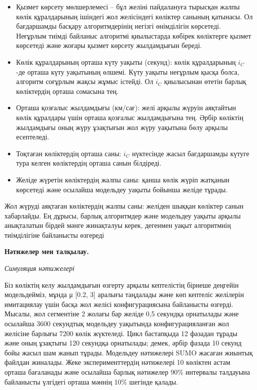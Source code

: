 \begin{itemize}
\item
  Қызмет көрсету мөлшерлемесі -- бұл желіні пайдалануға тырысқан жалпы
  көлік құралдарының ішіндегі жол желісіндегі көліктер санының қатынасы.
  Ол бағдаршамды басқару алгоритмдерінің негізгі өнімділігін көрсетеді.
  Неғұрлым тиімді байланыс алгоритмі қиылыстарда көбірек көліктерге
  қызмет көрсетеді және жоғары қызмет көрсету жылдамдығын береді.
\item
  Көлік құралдарының орташа күту уақыты (секунд): көлік құралдарының
  \(i_{C}\) -де орташа күту уақытының өлшемі. Күту уақыты неғұрлым қысқа
  болса, алгоритм соғұрлым жақсы жұмыс істейді. Ол \(i_{C}\) қиылысынан
  өтетін барлық көліктердің орташа сомасына тең.
\item
  Орташа қозғалыс жылдамдығы (км/сағ): желі арқылы жүруін аяқтайтын
  көлік құралдары үшін орташа қозғалыс жылдамдығына тең. Әрбір көліктің
  жылдамдығы оның жүру ұзақтығын жол жүру уақытына бөлу арқылы
  есептеледі.
\item
  Тоқтаған көліктердің орташа саны: \(i_{C}\) нүктесінде жасыл
  бағдаршамды күтуге тура келген көліктердің орташа санын білдіреді.
\item
  Желіде жүретін көліктердің жалпы саны: қанша көлік жүріп жатқанын
  көрсетеді және осылайша модельдеу уақыты бойынша желіде тұрады.
\end{itemize}

Жол жүруді аяқтаған көліктердің жалпы саны: желіден шыққан көліктер
санын хабарлайды. Ең дұрысы, барлық алгоритмдер және модельдеу уақыты
арқылы анықталатын бірдей мәнге жинақталуы керек, дегенмен уақыт
алгоритмнің тиімділігіне байланысты өзгереді

{\bfseries Нәтижелер мен талқылау.}

\emph{Симуляция нәтижелері}

Біз көліктің келу жылдамдығын өзгерту арқылы кептелістің бірнеше
деңгейін модельдейміз, мұнда μ {[}0.2, 3{]} аралығы таңдалады және көп
кептеліс желілерін имитациялау үшін басқа жол желісі конфигурациясына
байланысты өзгерді. Мысалы, жол сегментіне 2 жолағы бар желіде 0,5
секундқа орнатылады және осылайша 3600 секундтық модельдеу уақытында
конфигурацияланған жол желісіне барлығы 7200 көлік жүктеледі. Цикл
бастапқыда 12 фазадан тұрады және оның ұзақтығы 120 секундқа орнатылады;
демек, әрбір фазада 10 секунд бойы жасыл шам жанып тұрады. Модельдеу
нәтижелері SUMO жасаған жиынтық файлдан жиналады. Жеке эксперименттердің
нәтижелері 10 көліктен астам орташа бағаланады және осылайша барлық
нәтижелер 90\% интервалы талдауына байланысты үлгідегі орташа мәннің
10\% шегінде қалады.

